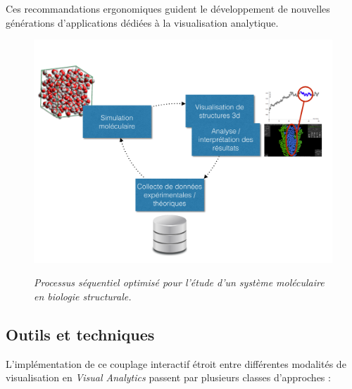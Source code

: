 Ces recommandations ergonomiques guident le développement de nouvelles générations d'applications dédiées à la visualisation analytique.

\begin{figure}
  \centering
  {\includegraphics[width=.75\linewidth]{./figures/ch2/ch2_structural_biology_optim.pdf}}
    \caption[Processus séquentiel optimisé pour l'étude d'un système moléculaire en biologie structurale.]{{\it Processus séquentiel optimisé pour l'étude d'un système moléculaire en biologie structurale.}}
  \label{Fig:schema_seq_bio_optim}
  \hspace{0.3cm}
\end{figure}


\subsection{Outils et techniques} \label{visu_ana_tools}

L'implémentation de ce couplage interactif étroit entre différentes modalités de visualisation en \textit{Visual Analytics} passent par plusieurs classes d'approches :

